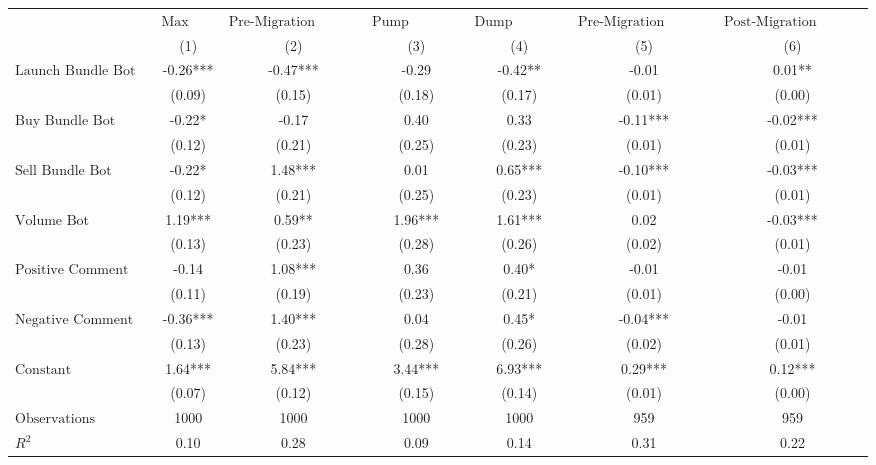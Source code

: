 \begin{tabular}{lcccccc}
\hline
 & $\text{Max Ret}$ & $\text{Pre-Migration Duration}$ & $\text{Pump Duration}$ & $\text{Dump Duration}$ & $\text{Pre-Migration Volatility}$ & $\text{Post-Migration Volatility}$ \\
 & (1) & (2) & (3) & (4) & (5) & (6)\\
\hline
$\text{Launch Bundle Bot}$ & -0.26*** & -0.47*** & -0.29 & -0.42** & -0.01 & 0.01** \\
 & (0.09) & (0.15) & (0.18) & (0.17) & (0.01) & (0.00) \\
$\text{Buy Bundle Bot}$ & -0.22* & -0.17 & 0.40 & 0.33 & -0.11*** & -0.02*** \\
 & (0.12) & (0.21) & (0.25) & (0.23) & (0.01) & (0.01) \\
$\text{Sell Bundle Bot}$ & -0.22* & 1.48*** & 0.01 & 0.65*** & -0.10*** & -0.03*** \\
 & (0.12) & (0.21) & (0.25) & (0.23) & (0.01) & (0.01) \\
$\text{Volume Bot}$ & 1.19*** & 0.59** & 1.96*** & 1.61*** & 0.02 & -0.03*** \\
 & (0.13) & (0.23) & (0.28) & (0.26) & (0.02) & (0.01) \\
$\text{Positive Comment Bot}$ & -0.14 & 1.08*** & 0.36 & 0.40* & -0.01 & -0.01 \\
 & (0.11) & (0.19) & (0.23) & (0.21) & (0.01) & (0.00) \\
$\text{Negative Comment Bot}$ & -0.36*** & 1.40*** & 0.04 & 0.45* & -0.04*** & -0.01 \\
 & (0.13) & (0.23) & (0.28) & (0.26) & (0.02) & (0.01) \\
$\text{Constant}$ & 1.64*** & 5.84*** & 3.44*** & 6.93*** & 0.29*** & 0.12*** \\
 & (0.07) & (0.12) & (0.15) & (0.14) & (0.01) & (0.00) \\
$\text{Observations}$ & 1000 & 1000 & 1000 & 1000 & 959 & 959 \\
$R^2$ & 0.10 & 0.28 & 0.09 & 0.14 & 0.31 & 0.22 \\
\hline
\end{tabular}
